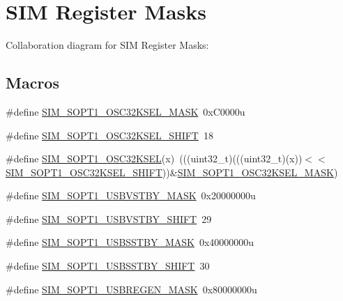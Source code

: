\hypertarget{group___s_i_m___register___masks}{}\section{S\+IM Register Masks}
\label{group___s_i_m___register___masks}
Collaboration diagram for S\+IM Register Masks\+:
\subsection*{Macros}
\begin{DoxyCompactItemize}
\item 
\#define \hyperlink{group___s_i_m___register___masks_ga5c660cd4a6d8062e6ef4afbc17c27fa4}{S\+I\+M\+\_\+\+S\+O\+P\+T1\+\_\+\+O\+S\+C32\+K\+S\+E\+L\+\_\+\+M\+A\+SK}~0x\+C0000u
\item 
\#define \hyperlink{group___s_i_m___register___masks_gac9e930c4ee375a2aee6fa6c97e061226}{S\+I\+M\+\_\+\+S\+O\+P\+T1\+\_\+\+O\+S\+C32\+K\+S\+E\+L\+\_\+\+S\+H\+I\+FT}~18
\item 
\#define \hyperlink{group___s_i_m___register___masks_gaf89520e7506a3dec707983ab729aef08}{S\+I\+M\+\_\+\+S\+O\+P\+T1\+\_\+\+O\+S\+C32\+K\+S\+EL}(x)~(((uint32\+\_\+t)(((uint32\+\_\+t)(x))$<$$<$\hyperlink{group___s_i_m___register___masks_gac9e930c4ee375a2aee6fa6c97e061226}{S\+I\+M\+\_\+\+S\+O\+P\+T1\+\_\+\+O\+S\+C32\+K\+S\+E\+L\+\_\+\+S\+H\+I\+FT}))\&\hyperlink{group___s_i_m___register___masks_ga5c660cd4a6d8062e6ef4afbc17c27fa4}{S\+I\+M\+\_\+\+S\+O\+P\+T1\+\_\+\+O\+S\+C32\+K\+S\+E\+L\+\_\+\+M\+A\+SK})
\item 
\#define \hyperlink{group___s_i_m___register___masks_gaaf0b406e4bd1800083f48727a7cde829}{S\+I\+M\+\_\+\+S\+O\+P\+T1\+\_\+\+U\+S\+B\+V\+S\+T\+B\+Y\+\_\+\+M\+A\+SK}~0x20000000u
\item 
\#define \hyperlink{group___s_i_m___register___masks_gae945165e21faf14e58288bce0918482a}{S\+I\+M\+\_\+\+S\+O\+P\+T1\+\_\+\+U\+S\+B\+V\+S\+T\+B\+Y\+\_\+\+S\+H\+I\+FT}~29
\item 
\#define \hyperlink{group___s_i_m___register___masks_ga93a808f7a1d75e26bc3ed565ab257617}{S\+I\+M\+\_\+\+S\+O\+P\+T1\+\_\+\+U\+S\+B\+S\+S\+T\+B\+Y\+\_\+\+M\+A\+SK}~0x40000000u
\item 
\#define \hyperlink{group___s_i_m___register___masks_ga8a24334d1be5bd01017bd364dd53f268}{S\+I\+M\+\_\+\+S\+O\+P\+T1\+\_\+\+U\+S\+B\+S\+S\+T\+B\+Y\+\_\+\+S\+H\+I\+FT}~30
\item 
\#define \hyperlink{group___s_i_m___register___masks_gac60c367119b3dcc752c4cf857b8a59b5}{S\+I\+M\+\_\+\+S\+O\+P\+T1\+\_\+\+U\+S\+B\+R\+E\+G\+E\+N\+\_\+\+M\+A\+SK}~0x80000000u
$$
\end{DoxyCompactItemize}
